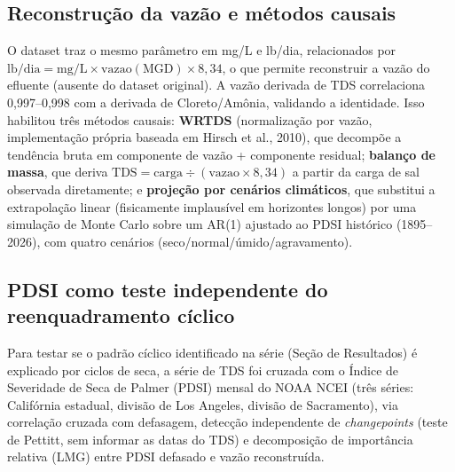 \subsection{Reconstrução da vazão e métodos causais}

O dataset traz o mesmo parâmetro em mg/L e lb/dia, relacionados por $\mathrm{lb/dia} = \mathrm{mg/L} \times \mathrm{vazao(MGD)} \times 8{,}34$, o que permite reconstruir a vazão do efluente (ausente do dataset original). A vazão derivada de TDS correlaciona 0,997--0,998 com a derivada de Cloreto/Amônia, validando a identidade. Isso habilitou três métodos causais: \textbf{WRTDS} (normalização por vazão, implementação própria baseada em Hirsch et al., 2010), que decompõe a tendência bruta em componente de vazão + componente residual; \textbf{balanço de massa}, que deriva $\mathrm{TDS} = \mathrm{carga} \div (\mathrm{vazao} \times 8{,}34)$ a partir da carga de sal observada diretamente; e \textbf{projeção por cenários climáticos}, que substitui a extrapolação linear (fisicamente implausível em horizontes longos) por uma simulação de Monte Carlo sobre um AR(1) ajustado ao PDSI histórico (1895--2026), com quatro cenários (seco/normal/úmido/agravamento).

\subsection{PDSI como teste independente do reenquadramento cíclico}

Para testar se o padrão cíclico identificado na série (Seção de Resultados) é explicado por ciclos de seca, a série de TDS foi cruzada com o Índice de Severidade de Seca de Palmer (PDSI) mensal do NOAA NCEI (três séries: Califórnia estadual, divisão de Los Angeles, divisão de Sacramento), via correlação cruzada com defasagem, detecção independente de \textit{changepoints} (teste de Pettitt, sem informar as datas do TDS) e decomposição de importância relativa (LMG) entre PDSI defasado e vazão reconstruída.
